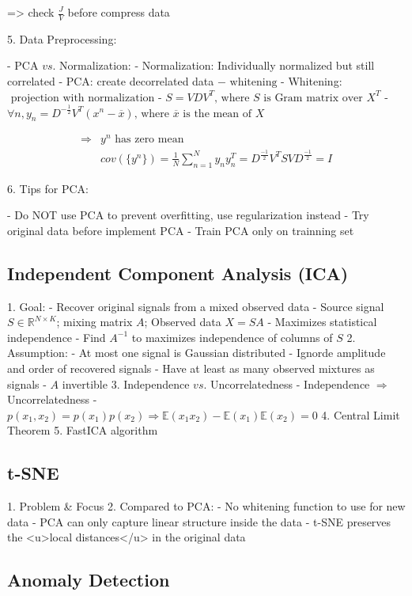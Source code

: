 => check $\frac JV$ before compress data 

5. Data Preprocessing:

- PCA $vs.$ Normalization:
- Normalization: Individually normalized but still correlated
- PCA: create decorrelated data $-\text{ whitening}$ 
- Whitening: $\text{ projection with normalization}$ 
- $S = VDV^T \text{, where $S$ is Gram matrix over $X^T$}$ 
- \(\forall n, y_n=D^{-\frac12}V^T(x^n-\overline x) \text{, where $\overline x$ is the mean of $X$}\) 

\begin{align} \Rightarrow & \text{{$y^n$} has zero mean} \\ & \displaystyle cov(\{y^n\}) = \frac 1 N \sum_{n=1}^Ny_ny_n^T= D^{\frac {-1} 2}V^TSVD^{\frac{-1}2}=I \end{align}

6. Tips for PCA:

- Do NOT use PCA to prevent overfitting, use regularization instead
- Try original data before implement PCA
- Train PCA only on trainning set

\subsection{Independent Component Analysis (ICA)}

1. Goal:
- Recover original signals from a mixed observed data
- Source signal $S\in \mathbb R^{N\times K}$; mixing matrix $A$; Observed data $X=SA$
- Maximizes statistical independence
- Find $A^{-1}$ to maximizes independence of columns of $S$
2. Assumption: 
- At most one signal is Gaussian distributed
- Ignorde amplitude and order of recovered signals
- Have at least as many observed mixtures as signals
- $A$ invertible
3. Independence $vs.$ Uncorrelatedness
- Independence $\Rightarrow$ Uncorrelatedness
- $p(x_1,x_2)=p(x_1)p(x_2) \Rightarrow \mathbb E(x_1x_2)-\mathbb E(x_1)\mathbb E(x_2) = 0$ 
4. Central Limit Theorem
5. FastICA algorithm

\subsection{t-SNE}

1. Problem \& Focus
2. Compared to PCA:
- No whitening function to use for new data
- PCA can only capture linear structure inside the data
- t-SNE preserves the <u>local distances</u> in the original data

\subsection{Anomaly Detection}

